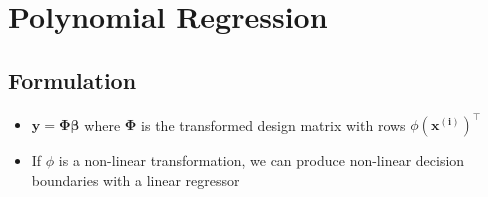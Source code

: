 \section{Polynomial Regression}
\subsection*{Formulation}
\begin{itemize}
    \item $\boldsymbol{y} = \boldsymbol{\Phi}\boldsymbol{\beta}$ where $\boldsymbol{\Phi}$  is the transformed design matrix with rows $\phi(\boldsymbol{x^{(i)}})^\intercal$
    \item If $\phi$ is a non-linear transformation, we can produce non-linear decision boundaries with a linear regressor
\end{itemize}